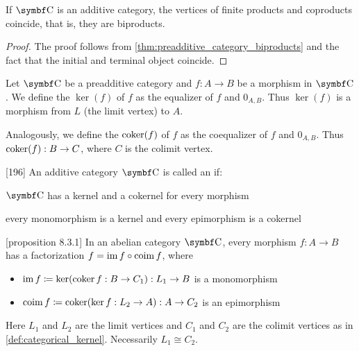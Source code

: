 \begin{theorem}\label{thm:additive_category_biproducts}
  If \( \Bold C \) is an additive category, the vertices of finite products and coproducts coincide, that is, they are biproducts.
\end{theorem}
\begin{proof}
  The proof follows from \cref{thm:preadditive_category_biproducts} and the fact that the initial and terminal object coincide.
\end{proof}

\begin{definition}\label{def:categorical_kernel}
  Let \( \Bold C \) be a preadditive category and \( f: A \to B \) be a morphism in \( \Bold C \). We define the  \( \ker(f) \) of \( f \) as the equalizer of \( f \) and \( 0_{A,B} \). Thus \( \ker(f) \) is a morphism from \( L \) (the limit vertex) to \( A \).

  Analogously, we define the  \( \operatorname{co}\!\ker(f) \) of \( f \) as the coequalizer of \( f \) and \( 0_{A,B} \). Thus \( \operatorname{co}\!\ker(f): B \to C \), where \( C \) is the colimit vertex.
\end{definition}

\begin{definition}\label{def:abelian_category}\cite{MacLane1994}[196]
  An additive category \( \Bold C \) is called an  if:
  \begin{defenum}
    \item \( \Bold C \) has a kernel and a cokernel for every morphism
    \item every monomorphism is a kernel and every epimorphism is a cokernel
  \end{defenum}
\end{definition}

\begin{proposition}\label{def:abelian_category_morphism_factorization}\cite{MacLane1994}[proposition 8.3.1]
  In an abelian category \( \Bold C \), every morphism \( f: A \to B \) has a factorization \( f = \operatorname{im} f \circ \operatorname{co}\!\operatorname{im} f \), where
  \begin{itemize}
    \item \( \operatorname{im} f \coloneqq \ker(\operatorname{co}\!\ker f: B \to C_1): L_1 \to B \) is a monomorphism
    \item \( \operatorname{co}\!\operatorname{im} f \coloneqq \operatorname{co}\!\ker(\ker f: L_2 \to A): A \to C_2 \) is an epimorphism
  \end{itemize}
  Here \( L_1 \) and \( L_2 \) are the limit vertices and \( C_1 \) and \( C_2 \) are the colimit vertices as in \cref{def:categorical_kernel}. Necessarily \( L_1 \cong C_2 \).
\end{proposition}

